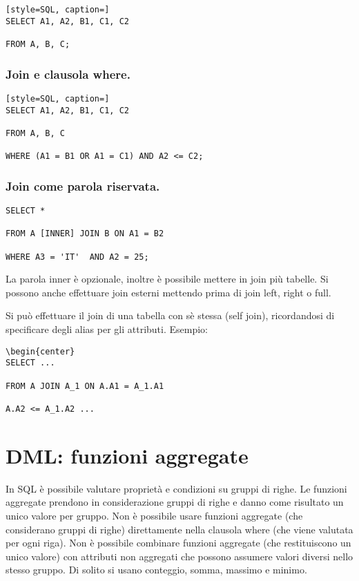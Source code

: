 \begin{lstlisting}[style=SQL, caption=]
SELECT A1, A2, B1, C1, C2

FROM A, B, C;
\end{lstlisting}

\subsubsection{Join e clausola where.}

\begin{lstlisting}[style=SQL, caption=]
SELECT A1, A2, B1, C1, C2

FROM A, B, C

WHERE (A1 = B1 OR A1 = C1) AND A2 <= C2; 
\end{lstlisting}

\subsubsection{Join come parola riservata.}

\begin{lstlisting}[style=SQL, caption=Join]
SELECT *

FROM A [INNER] JOIN B ON A1 = B2

WHERE A3 = 'IT'  AND A2 = 25; 
\end{lstlisting}

La parola inner è opzionale, inoltre è possibile mettere in join più tabelle. Si possono anche effettuare join esterni mettendo prima di join left, right o full. 

Si può effettuare il join di una tabella con sè stessa (self join), ricordandosi di specificare degli alias per gli attributi. Esempio:

\begin{lstlisting}[style=SQL, caption=Self-Join]
\begin{center}
SELECT ...

FROM A JOIN A_1 ON A.A1 = A_1.A1

A.A2 <= A_1.A2 ... 
\end{lstlisting}

\section{DML: funzioni aggregate}

In SQL è possibile valutare proprietà e condizioni su gruppi di righe. Le funzioni aggregate prendono in considerazione gruppi di righe e danno come risultato un unico valore per gruppo. Non è possibile usare funzioni aggregate (che
considerano gruppi di righe) direttamente nella clausola where (che viene valutata per ogni riga). Non è possibile combinare funzioni aggregate (che restituiscono un unico valore) con attributi non aggregati che possono assumere valori diversi nello stesso gruppo. Di solito si usano conteggio, somma, massimo e minimo.


